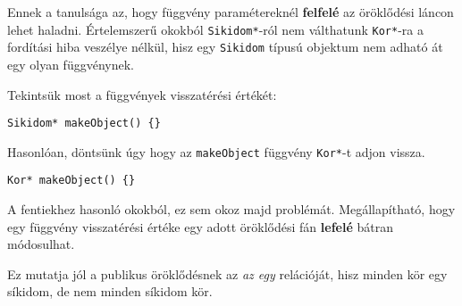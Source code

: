 \documentclass[a4paper,11.5pt,table]{article}
\begin{document}
	Ennek a tanulsága az, hogy függvény paramétereknél \textbf{felfelé} az öröklődési láncon lehet haladni. Értelemszerű okokból \texttt{Sikidom*}-ról nem válthatunk \texttt{Kor*}-ra a fordítási hiba veszélye nélkül, hisz egy \texttt{Sikidom} típusú objektum nem adható át egy olyan függvénynek.
	
	\medskip
	Tekintsük most a függvények visszatérési értékét:
	\begin{lstlisting}
Sikidom* makeObject() {}
	\end{lstlisting}
	Hasonlóan, döntsünk úgy hogy az \texttt{makeObject} függvény \texttt{Kor*}-t adjon vissza.
	\begin{lstlisting}
Kor* makeObject() {}
	\end{lstlisting}
	A fentiekhez hasonló okokból, ez sem okoz majd problémát. Megállapítható, hogy egy függvény visszatérési értéke egy adott öröklődési fán \textbf{lefelé} bátran módosulhat.
	\begin{note}
		Ez mutatja jól a publikus öröklődésnek az \textit{az egy} relációját, hisz minden kör egy síkidom, de nem minden síkidom kör.
	\end{note}
	
\end{document}
